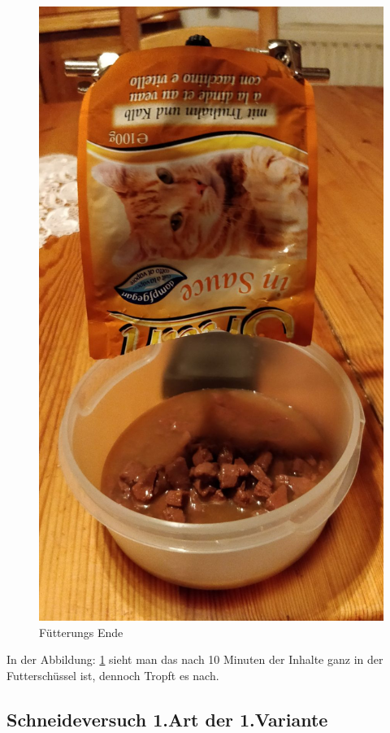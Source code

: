 \begin{figure}[H]
\begin{minipage}[hbt]{.3\linewidth}
     \includegraphics[width=\linewidth]{Bilder/Fuetterungsexperiment/Fuetterungs_Ende}  
      \caption{Fütterungs Ende}
     \label{Fütterungs_Ende}
   \end{minipage}
\end{figure}

In der Abbildung: \ref{Fütterungs_Ende} sieht man das nach 10 Minuten der Inhalte ganz in der Futterschüssel ist, dennoch Tropft es nach.
\newpage
\subsection{Schneideversuch 1.Art der 1.Variante}

